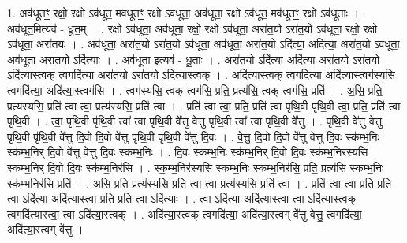 \documentclass[17pt]{extarticle}
\begin{document}
1. अव॑धूतꣳ॒॒ रक्षो॒ रक्षो ऽव॑धूत॒ मव॑धूतꣳ॒॒ रक्षो ऽव॑धूता॒ अव॑धूता॒ रक्षो 
ऽव॑धूत॒ मव॑धूतꣳ॒॒ रक्षो ऽव॑धूताः । . अव॑धूत॒मित्यव॑ - धू॒त॒म् । . रक्षो ऽव॑धूता॒ अव॑धूता॒ रक्षो॒ रक्षो ऽव॑धूता॒ अरा॑त॒यो ऽरा॑त॒यो ऽव॑धूता॒ रक्षो॒ रक्षो ऽव॑धूता॒ अरा॑तयः । . अव॑धूता॒ अरा॑त॒यो ऽरा॑त॒यो ऽव॑धूता॒ अव॑धूता॒ अरा॑त॒यो ऽदि॑त्या॒ अदि॑त्या॒ अरा॑त॒यो ऽव॑धूता॒ अव॑धूता॒ अरा॑त॒यो ऽदि॑त्याः । . अव॑धूता॒ इत्यव॑ - धू॒ताः॒ । . अरा॑त॒यो ऽदि॑त्या॒ अदि॑त्या॒ अरा॑त॒यो ऽरा॑त॒यो ऽदि॑त्या॒स्त्वक् त्वगदि॑त्या॒ अरा॑त॒यो ऽरा॑त॒यो ऽदि॑त्या॒स्त्वक् । . अदि॑त्या॒स्त्वक् त्वगदि॑त्या॒ अदि॑त्या॒स्त्वग॑स्यसि॒ त्वगदि॑त्या॒ अदि॑त्या॒स्त्वग॑सि । . त्वग॑स्यसि॒ त्वक् त्वग॑सि॒ प्रति॒ प्रत्य॑सि॒ त्वक् त्वग॑सि॒ प्रति॑ । . अ॒सि॒ प्रति॒ प्रत्य॑स्यसि॒ प्रति॑ त्वा त्वा॒ प्रत्य॑स्यसि॒ प्रति॑ त्वा । . प्रति॑ त्वा त्वा॒ प्रति॒ प्रति॑ त्वा पृथि॒वी पृ॑थि॒वी त्वा॒ प्रति॒ प्रति॑ त्वा पृथि॒वी । . त्वा॒ पृ॒थि॒वी पृ॑थि॒वी त्वा᳚ त्वा पृथि॒वी वे᳚त्तु वेत्तु पृथि॒वी त्वा᳚ त्वा पृथि॒वी वे᳚त्तु । . पृ॒थि॒वी वे᳚त्तु वेत्तु पृथि॒वी पृ॑थि॒वी वे᳚त्तु दि॒वो दि॒वो वे᳚त्तु पृथि॒वी पृ॑थि॒वी वे᳚त्तु दि॒वः । . वे॒त्तु॒ दि॒वो दि॒वो वे᳚त्तु वेत्तु दि॒वः स्क॑म्भ॒निः स्क॑म्भ॒निर् दि॒वो वे᳚त्तु वेत्तु दि॒वः स्क॑म्भ॒निः । . दि॒वः स्क॑म्भ॒निः स्क॑म्भ॒निर् दि॒वो दि॒वः स्क॑म्भ॒निर॑स्यसि स्कम्भ॒निर् दि॒वो दि॒वः स्क॑म्भ॒निर॑सि । . स्क॒म्भ॒निर॑स्यसि स्कम्भ॒निः स्क॑म्भ॒निर॑सि॒ प्रति॒ प्रत्य॑सि स्कम्भ॒निः स्क॑म्भ॒निर॑सि॒ प्रति॑ । . अ॒सि॒ प्रति॒ प्रत्य॑स्यसि॒ प्रति॑ त्वा त्वा॒ प्रत्य॑स्यसि॒ प्रति॑ त्वा । . प्रति॑ त्वा त्वा॒ प्रति॒ प्रति॒ त्वा ऽदि॑त्या॒ अदि॑त्यास्त्वा॒ प्रति॒ प्रति॒ त्वा ऽदि॑त्याः । . त्वा ऽदि॑त्या॒ अदि॑त्यास्त्वा॒ त्वा ऽदि॑त्या॒स्त्वक् त्वगदि॑त्यास्त्वा॒ त्वा ऽदि॑त्या॒स्त्वक् । . अदि॑त्या॒स्त्वक् त्वगदि॑त्या॒ अदि॑त्या॒स्त्वग् वे᳚त्तु वेत्तु॒ त्वगदि॑त्या॒ अदि॑त्या॒स्त्वग् वे᳚त्तु । \newline
\end{document}
